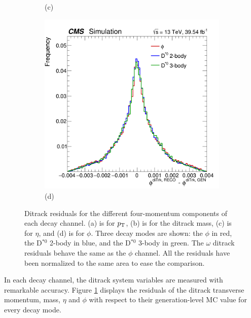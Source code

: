 \begin{figure}[!ht]
\begin{subfigure}[t]{0.50\mylength}
            \vspace*{-0.2cm}
            \caption{\footnotesize (c)}
    \end{subfigure}%
    \begin{subfigure}[t]{0.50\mylength}
            \centering
            \includegraphics[width=0.49\mylength]{resources/plots/ditrack_residuals_phi.png}
            \vspace*{-0.2cm}
            \caption{\footnotesize (d)}
    \end{subfigure}%
    \vspace*{-0.0cm}
    \caption{Ditrack residuals for the different four-momentum components of each decay channel. (a) is for $p_\text{T}$, (b) is for the ditrack mass, (c) is for $\eta$, and (d) is for $\phi$. Three decay modes are shown: the $\phi$ in red, the D$^{*0}$ 2-body in blue, and the D$^{*0}$ 3-body in green. The $\omega$ ditrack residuals behave the same as the $\phi$ channel. All the residuals have been normalized to the same area to ease the comparison.}
    \label{fig:ditrack_residuals}
    \vspace*{-0.0cm}
\end{figure}

In each decay channel, the ditrack system variables are measured with remarkable accuracy. Figure \ref{fig:ditrack_residuals} displays the residuals of the ditrack transverse momentum, mass, $\eta$ and $\phi$ with respect to their generation-level MC value for every decay mode.

